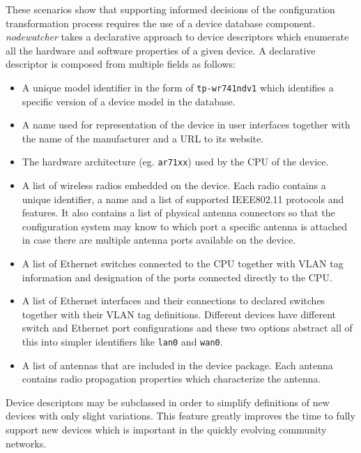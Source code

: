 \documentclass[5p,sort&compress]{elsarticle}
\newcommand{\nodewatcher}{\textit{nodewatcher}}
\begin{document}
These scenarios show that supporting informed decisions of the configuration transformation process requires the use of a device database component.
\nodewatcher{} takes a declarative approach to device descriptors which enumerate all the hardware and software properties of a given device.
A declarative descriptor is composed from multiple fields as follows:
\begin{itemize}
\item A unique model identifier in the form of \texttt{tp-wr741ndv1} which identifies a specific version of a device model in the database.

\item A name used for representation of the device in user interfaces together with the name of the manufacturer and a URL to its website.

\item The hardware architecture (eg. \texttt{ar71xx}) used by the CPU of the device.

\item A list of wireless radios embedded on the device.
Each radio contains a unique identifier, a name and a list of supported IEEE802.11 protocols and features.
It also contains a list of physical antenna connectors so that the configuration system may know to which port a specific antenna is attached in case there are multiple antenna ports available on the device.

\item A list of Ethernet switches connected to the CPU together with VLAN tag information and designation of the ports connected directly to the CPU.

\item A list of Ethernet interfaces and their connections to declared switches together with their VLAN tag definitions. 
Different devices have different switch and Ethernet port configurations and these two options abstract all of this into simpler identifiers like \texttt{lan0} and \texttt{wan0}.

\item A list of antennas that are included in the device package.
Each antenna contains radio propagation properties which characterize the antenna.
\end{itemize}

Device descriptors may be subclassed in order to simplify definitions of new devices with only slight variations.
This feature greatly improves the time to fully support new devices which is important in the quickly evolving community networks.
\end{document}
